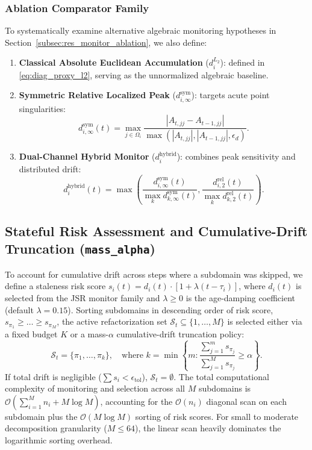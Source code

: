 \documentclass[preprint,12pt,3p]{elsarticle}
\begin{document}
\subsubsection{Ablation Comparator Family}
To systematically examine alternative algebraic monitoring hypotheses in Section~\ref{subsec:res_monitor_ablation}, we also define:
\begin{enumerate}
    \item \textbf{Classical Absolute Euclidean Accumulation} ($d_i^{L_2}$): defined in \eqref{eq:diag_proxy_l2}, serving as the unnormalized algebraic baseline.
    \item \textbf{Symmetric Relative Localized Peak} ($d_{i, \infty}^{\text{sym}}$): targets acute point singularities:
    \begin{equation}
    d_{i, \infty}^{\text{sym}}(t) = \max_{j \in \Omega_i} \frac{|A_{t, jj} - A_{t-1, jj}|}{\max(|A_{t, jj}|, |A_{t-1, jj}|, \epsilon_d)}.
    \label{eq:diag_proxy_linf}
    \end{equation}
    \item \textbf{Dual-Channel Hybrid Monitor} ($d_i^{\text{hybrid}}$): combines peak sensitivity and distributed drift:
    \begin{equation}
    d_i^{\text{hybrid}}(t) = \max\left( \frac{d_{i, \infty}^{\text{sym}}(t)}{\max_{k} d_{k, \infty}^{\text{sym}}(t)}, \frac{d_{i, 2}^{\text{rel}}(t)}{\max_{k} d_{k, 2}^{\text{rel}}(t)} \right).
    \label{eq:diag_proxy_hybrid}
    \end{equation}
\end{enumerate}

\subsection{Stateful Risk Assessment and Cumulative-Drift Truncation (\texttt{mass\_alpha})}
To account for cumulative drift across steps where a subdomain was skipped, we define a staleness risk score $s_i(t) = d_i(t) \cdot [1 + \lambda (t - \tau_i)]$, where $d_i(t)$ is selected from the JSR monitor family and $\lambda \ge 0$ is the age-damping coefficient (default $\lambda = 0.15$). Sorting subdomains in descending order of risk score, $s_{\pi_1} \ge \dots \ge s_{\pi_M}$, the active refactorization set $\mathcal{S}_t \subseteq \{1, \dots, M\}$ is selected either via a fixed budget $K$ or a mass-$\alpha$ cumulative-drift truncation policy:
\begin{equation}
\mathcal{S}_t = \{ \pi_1, \dots, \pi_k \}, \quad \text{where } k = \min \left\{ m : \frac{\sum_{j=1}^m s_{\pi_j}}{\sum_{j=1}^M s_{\pi_j}} \ge \alpha \right\}.
\label{eq:cumulative_drift_truncation}
\end{equation}
If total drift is negligible ($\sum s_i < \epsilon_{\text{tol}}$), $\mathcal{S}_t = \emptyset$. The total computational complexity of monitoring and selection across all $M$ subdomains is $\mathcal{O}\left(\sum_{i=1}^M n_i + M \log M\right)$, accounting for the $\mathcal{O}(n_i)$ diagonal scan on each subdomain plus the $\mathcal{O}(M \log M)$ sorting of risk scores. For small to moderate decomposition granularity ($M \le 64$), the linear scan heavily dominates the logarithmic sorting overhead.
\end{document}

